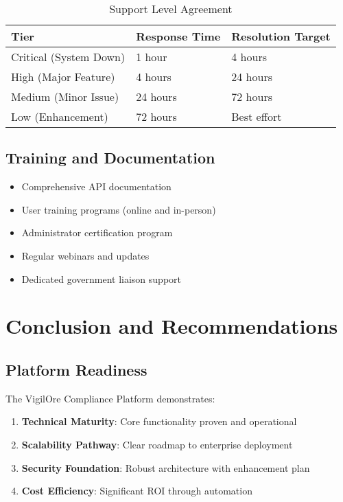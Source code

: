 \documentclass[11pt,a4paper]{article}
\begin{document}
\begin{table}[H]
\centering
\begin{tabular}{lll}
\toprule
\textbf{Tier} & \textbf{Response Time} & \textbf{Resolution Target} \\
\midrule
Critical (System Down) & 1 hour & 4 hours \\
High (Major Feature) & 4 hours & 24 hours \\
Medium (Minor Issue) & 24 hours & 72 hours \\
Low (Enhancement) & 72 hours & Best effort \\
\bottomrule
\end{tabular}
\caption{Support Level Agreement}
\end{table}

\subsection{Training and Documentation}

\begin{itemize}
    \item Comprehensive API documentation
    \item User training programs (online and in-person)
    \item Administrator certification program
    \item Regular webinars and updates
    \item Dedicated government liaison support
\end{itemize}

\section{Conclusion and Recommendations}

\subsection{Platform Readiness}

The VigilOre Compliance Platform demonstrates:

\begin{enumerate}
    \item \textbf{Technical Maturity}: Core functionality proven and operational
    \item \textbf{Scalability Pathway}: Clear roadmap to enterprise deployment
    \item \textbf{Security Foundation}: Robust architecture with enhancement plan
    \item \textbf{Cost Efficiency}: Significant ROI through automation
\end{enumerate}
\end{document}
